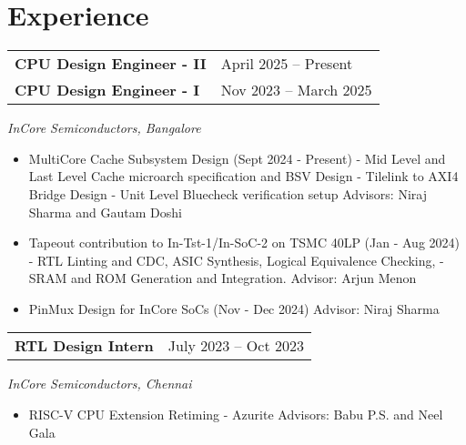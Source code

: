 \section{\sc Experience}


\begin{tabular}{@{}p{4in}p{2in}}
    {\bf{CPU Design Engineer - II}}  & April 2025 – Present \\
    {\bf{CPU Design Engineer - I}}  & Nov 2023 – March 2025 \\
  \end{tabular}  
  \textit{InCore Semiconductors, Bangalore} 
  \begin{itemize}
    \setlength\itemsep{0em}
    \item MultiCore Cache Subsystem Design (Sept 2024 - Present)
      \subitem - Mid Level and Last Level Cache microarch specification and BSV Design 
      \subitem - Tilelink to AXI4 Bridge Design
      \subitem - Unit Level Bluecheck verification setup
      \subitem Advisors: Niraj Sharma and Gautam Doshi     
    \item Tapeout contribution to In-Tst-1/In-SoC-2 on TSMC 40LP (Jan - Aug 2024)
      \subitem - RTL Linting and CDC, ASIC Synthesis, Logical Equivalence Checking, 
      \subitem - SRAM and ROM Generation and Integration.
      \subitem Advisor: Arjun Menon
    \item PinMux Design for InCore SoCs (Nov - Dec 2024)
      \subitem Advisor: Niraj Sharma       
\end{itemize}

\begin{tabular}{@{}p{4in}p{2in}}
  {\bf{RTL Design Intern}}  & July 2023 – Oct 2023 \\
\end{tabular}  
\textit{InCore Semiconductors, Chennai} 
\begin{itemize}
    \setlength\itemsep{0em}
  \item RISC-V CPU Extension Retiming - Azurite 
    \subitem Advisors: Babu P.S. and Neel Gala  
\end{itemize}


